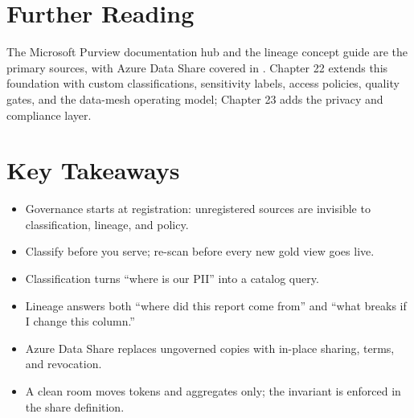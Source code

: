 \section{Further Reading}
The Microsoft Purview documentation hub \cite{microsoft2025purview} and the lineage concept guide \cite{microsoft2025purviewLineage} are the primary sources, with Azure Data Share covered in \cite{microsoft2025dataShare}. Chapter 22 extends this foundation with custom classifications, sensitivity labels, access policies, quality gates, and the data-mesh operating model; Chapter 23 adds the privacy and compliance layer.

\section*{Key Takeaways}
\begin{itemize}
    \item Governance starts at registration: unregistered sources are invisible to classification, lineage, and policy.
    \item Classify before you serve; re-scan before every new gold view goes live.
    \item Classification turns ``where is our PII'' into a catalog query.
    \item Lineage answers both ``where did this report come from'' and ``what breaks if I change this column.''
    \item Azure Data Share replaces ungoverned copies with in-place sharing, terms, and revocation.
    \item A clean room moves tokens and aggregates only; the invariant is enforced in the share definition.
\end{itemize}

